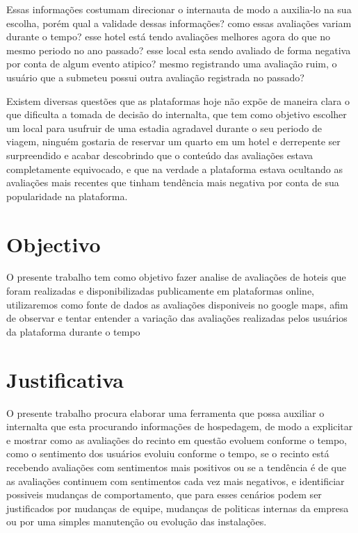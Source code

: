 Essas informações costumam direcionar o internauta de modo a auxilia-lo na sua escolha, porém qual a validade dessas informações? como essas avaliações variam durante o tempo? esse hotel está tendo avaliações melhores agora do que no mesmo periodo no ano passado? esse local esta sendo avaliado de forma negativa por conta de algum evento atipico? mesmo registrando uma avaliação ruim, o usuário que a submeteu possui outra avaliação registrada no passado? 

Existem diversas questões que as plataformas hoje não expõe de maneira clara o que dificulta a tomada de decisão do internalta, que tem como objetivo escolher um local para usufruir de uma estadia agradavel durante o seu periodo de viagem, ninguém gostaria de reservar um quarto em um hotel e derrepente ser surpreendido e acabar descobrindo que o conteúdo das avaliações estava completamente equivocado, e que na verdade a plataforma estava ocultando as avaliações mais recentes que tinham tendência mais negativa por conta de sua popularidade na plataforma.

\begin{comment}
O presente relatório está estruturado da seguinte forma: o capítulo~\ref{cap:justificativa} apresenta..., o capítulo~\ref{cap:fund_teorica}... O capítulo~\ref{cap:metodologia} ..., o capítulo~\ref{cap:resultados} .... O capítulo~\ref{cap:conclusao} 

Demonstração de citação: o software de análise foi desenvolvido na linguagem Python~\cite{van1995python}, usando as bibliotecas Pandas~\cite{mckinney2010data} e Scikit-learn~\cite{scikit-learn}.
\end{comment}

\section{Objectivo}


O presente trabalho tem como objetivo fazer analise de avaliações de hoteis que foram realizadas e disponibilizadas publicamente em plataformas online, utilizaremos como fonte de dados as avaliações disponiveis no google maps, afim de observar e tentar entender a variação das avaliações realizadas pelos usuários da plataforma durante o tempo

\section{Justificativa}

O presente trabalho procura elaborar uma ferramenta que possa auxiliar o internalta que esta procurando informações de hospedagem, de modo a explicitar e mostrar como as avaliações do recinto em questão evoluem conforme o tempo, como o sentimento dos usuários evoluiu conforme o tempo, se o recinto está recebendo avaliações com sentimentos mais positivos ou se a tendência é de que as avaliações continuem com sentimentos cada vez mais negativos, e identificiar possiveis mudanças de comportamento, que para esses cenários podem ser justificados por mudanças de equipe, mudanças de politicas internas da empresa ou por uma simples manutenção ou evolução das instalações. 